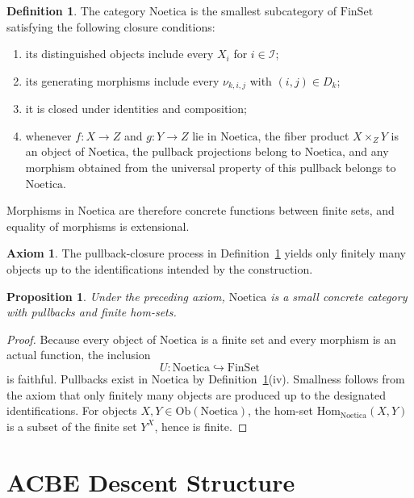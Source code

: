 \documentclass[11pt]{amsart}
\numberwithin{equation}{section}
\newtheorem{proposition}[theorem]{Proposition}
\theoremstyle{definition}
\newtheorem{definition}[theorem]{Definition}
\newtheorem{axiom}[theorem]{Axiom}
\theoremstyle{remark}
\newcommand{\Noetica}{\mathrm{Noetica}}
\newcommand{\FinSet}{\mathrm{FinSet}}
\newcommand{\I}{\mathcal{I}}
\begin{document}
\begin{definition}\label{def:noetica}
The category \(\Noetica\) is the smallest subcategory of \(\FinSet\) satisfying the following closure conditions:
\begin{enumerate}[label=(\roman*)]
\item its distinguished objects include every \(X_i\) for \(i \in \I\);
\item its generating morphisms include every \(\nu_{k,i,j}\) with \((i,j)\in D_k\);
\item it is closed under identities and composition;
\item whenever \(f : X \to Z\) and \(g : Y \to Z\) lie in \(\Noetica\), the fiber product \(X \times_Z Y\) is an object of \(\Noetica\), the pullback projections belong to \(\Noetica\), and any morphism obtained from the universal property of this pullback belongs to \(\Noetica\).
\end{enumerate}
Morphisms in \(\Noetica\) are therefore concrete functions between finite sets, and equality of morphisms is extensional.
\end{definition}

\begin{axiom}
The pullback-closure process in Definition~\ref{def:noetica} yields only finitely many objects up to the identifications intended by the construction.
\end{axiom}

\begin{proposition}
Under the preceding axiom, \(\Noetica\) is a small concrete category with pullbacks and finite hom-sets.
\end{proposition}

\begin{proof}
Because every object of \(\Noetica\) is a finite set and every morphism is an actual function, the inclusion
\[
U : \Noetica \hookrightarrow \FinSet
\]
is faithful. Pullbacks exist in \(\Noetica\) by Definition~\ref{def:noetica}(iv). Smallness follows from the axiom that only finitely many objects are produced up to the designated identifications. For objects \(X,Y \in \mathrm{Ob}(\Noetica)\), the hom-set \(\mathrm{Hom}_{\Noetica}(X,Y)\) is a subset of the finite set \(Y^{X}\), hence is finite.
\end{proof}

\section{ACBE Descent Structure}
\end{document}
